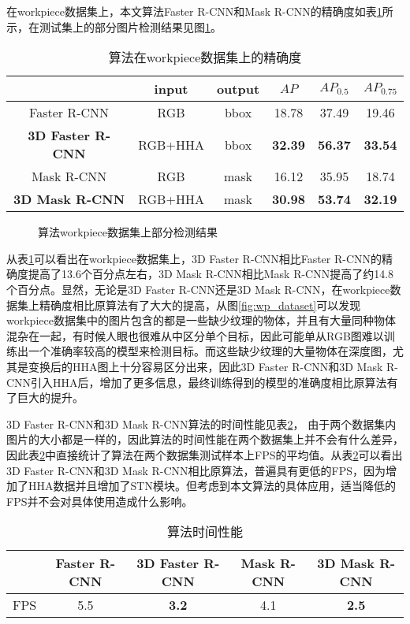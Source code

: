 在workpiece数据集上，本文算法Faster R-CNN和Mask R-CNN的精确度如表\ref{tab:ap2}所示，在测试集上的部分图片检测结果见图\ref{fig:wp_res}。
\begin{table}[ht]
  \centering
  \caption{算法在workpiece数据集上的精确度}
    \begin{tabular}{cccccc}
      \toprule
      &input&output&$AP$&$AP_{0.5}$&$AP_{0.75}$ \\
      \midrule
      Faster R-CNN&RGB&bbox&18.78&37.49&19.46 \\
      \bf{3D Faster R-CNN}&RGB+HHA&bbox&\bf{32.39}&\bf{56.37}&\bf{33.54} \\
      Mask R-CNN&RGB&mask&16.12&35.95&18.74 \\
      \bf{3D Mask R-CNN}&RGB+HHA&mask&\bf{30.98}&\bf{53.74}&\bf{32.19} \\
      \bottomrule
    \end{tabular}
  \label{tab:ap2}
\end{table}
\begin{figure}[ht]
  \centering
  \hskip0.2cm
  \hskip0.2cm
  \caption{算法workpiece数据集上部分检测结果}
  \label{fig:wp_res}
\end{figure}
从表\ref{tab:ap2}可以看出在workpiece数据集上，3D Faster R-CNN相比Faster R-CNN的精确度提高了13.6个百分点左右，3D Mask R-CNN相比Mask R-CNN提高了约14.8个百分点。显然，无论是3D Faster R-CNN还是3D Mask R-CNN，在workpiece数据集上精确度相比原算法有了大大的提高，从图\ref{fig:wp_dataset}可以发现workpiece数据集中的图片包含的都是一些缺少纹理的物体，并且有大量同种物体混杂在一起，有时候人眼也很难从中区分单个目标，因此可能单从RGB图难以训练出一个准确率较高的模型来检测目标。而这些缺少纹理的大量物体在深度图，尤其是变换后的HHA图上十分容易区分出来，因此3D Faster R-CNN和3D Mask R-CNN引入HHA后，增加了更多信息，最终训练得到的模型的准确度相比原算法有了巨大的提升。

3D Faster R-CNN和3D Mask R-CNN算法的时间性能见表\ref{tab:fps}，
由于两个数据集内图片的大小都是一样的，因此算法的时间性能在两个数据集上并不会有什么差异，因此表\ref{tab:fps}中直接统计了算法在两个数据集测试样本上FPS的平均值。从表\ref{tab:fps}可以看出3D Faster R-CNN和3D Mask R-CNN相比原算法，普遍具有更低的FPS，因为增加了HHA数据并且增加了STN模块。但考虑到本文算法的具体应用，适当降低的FPS并不会对具体使用造成什么影响。
\begin{table}[ht]
  \centering
  \begin{tabular}{ccccc}
    \toprule
    &Faster R-CNN&\bf{3D Faster R-CNN}&Mask R-CNN&\bf{3D Mask R-CNN} \\
    \midrule
    FPS&5.5&\bf{3.2}&4.1&\bf{2.5} \\
    \bottomrule
  \end{tabular}
  \caption{算法时间性能}
  \label{tab:fps}
\end{table}

